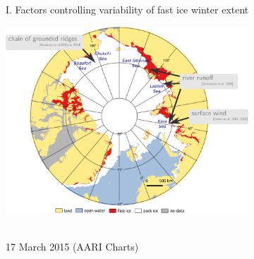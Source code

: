 \documentclass[8pt]{beamer}
\begin{document}
\setwatermark{\fontsize{125pt}{125pt}\selectfont{}}
\begin{frame}[fragile]{I. Factors controlling variability of fast ice winter extent}
	\begin{center}
		\includegraphics[height=7cm]{./img/ArcticSI_Mar2015_FI_know.pdf}\\
	\end{center}
	~\\

	17 March 2015 (AARI Charts)
\end{frame}
\end{document}

